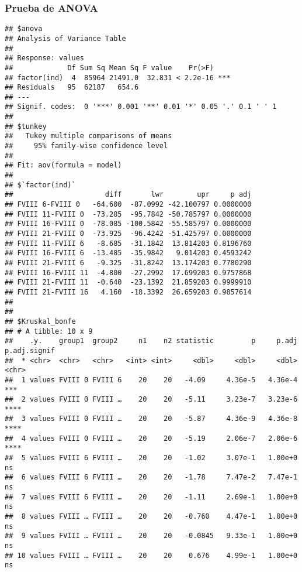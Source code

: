 \documentclass[
]{article}
\begin{document}
\hypertarget{prueba-de-anova-7}{%
\subsubsection{Prueba de ANOVA}\label{prueba-de-anova-7}}

\begin{verbatim}
## $anova
## Analysis of Variance Table
## 
## Response: values
##             Df Sum Sq Mean Sq F value    Pr(>F)    
## factor(ind)  4  85964 21491.0  32.831 < 2.2e-16 ***
## Residuals   95  62187   654.6                      
## ---
## Signif. codes:  0 '***' 0.001 '**' 0.01 '*' 0.05 '.' 0.1 ' ' 1
## 
## $tunkey
##   Tukey multiple comparisons of means
##     95% family-wise confidence level
## 
## Fit: aov(formula = model)
## 
## $`factor(ind)`
##                      diff       lwr        upr     p adj
## FVIII 6-FVIII 0   -64.600  -87.0992 -42.100797 0.0000000
## FVIII 11-FVIII 0  -73.285  -95.7842 -50.785797 0.0000000
## FVIII 16-FVIII 0  -78.085 -100.5842 -55.585797 0.0000000
## FVIII 21-FVIII 0  -73.925  -96.4242 -51.425797 0.0000000
## FVIII 11-FVIII 6   -8.685  -31.1842  13.814203 0.8196760
## FVIII 16-FVIII 6  -13.485  -35.9842   9.014203 0.4593242
## FVIII 21-FVIII 6   -9.325  -31.8242  13.174203 0.7780290
## FVIII 16-FVIII 11  -4.800  -27.2992  17.699203 0.9757868
## FVIII 21-FVIII 11  -0.640  -23.1392  21.859203 0.9999910
## FVIII 21-FVIII 16   4.160  -18.3392  26.659203 0.9857614
## 
## 
## $Kruskal_bonfe
## # A tibble: 10 x 9
##    .y.    group1  group2     n1    n2 statistic         p     p.adj p.adj.signif
##  * <chr>  <chr>   <chr>   <int> <int>     <dbl>     <dbl>     <dbl> <chr>       
##  1 values FVIII 0 FVIII 6    20    20   -4.09     4.36e-5   4.36e-4 ***         
##  2 values FVIII 0 FVIII …    20    20   -5.11     3.23e-7   3.23e-6 ****        
##  3 values FVIII 0 FVIII …    20    20   -5.87     4.36e-9   4.36e-8 ****        
##  4 values FVIII 0 FVIII …    20    20   -5.19     2.06e-7   2.06e-6 ****        
##  5 values FVIII 6 FVIII …    20    20   -1.02     3.07e-1   1.00e+0 ns          
##  6 values FVIII 6 FVIII …    20    20   -1.78     7.47e-2   7.47e-1 ns          
##  7 values FVIII 6 FVIII …    20    20   -1.11     2.69e-1   1.00e+0 ns          
##  8 values FVIII … FVIII …    20    20   -0.760    4.47e-1   1.00e+0 ns          
##  9 values FVIII … FVIII …    20    20   -0.0845   9.33e-1   1.00e+0 ns          
## 10 values FVIII … FVIII …    20    20    0.676    4.99e-1   1.00e+0 ns
\end{verbatim}
\end{document}
